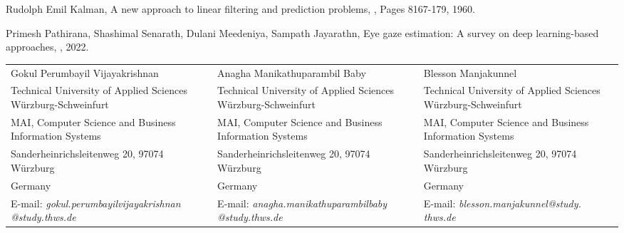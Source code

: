 \documentclass[10pt,a4paper,twoside]{article}
\begin{document}
\begin{thebibliography}{*}
Rudolph Emil Kalman,
\newblock A new approach to linear filtering and prediction problems,
, Pages 8167-179, 1960.
\vspace{-7pt}

Primesh Pathirana, Shashimal Senarath, Dulani Meedeniya, Sampath Jayarathn,
\newblock Eye gaze estimation: A survey on deep learning-based approaches,
, 2022.
\vspace{-7pt}

\end{thebibliography}

\vspace*{1cm} {\footnotesize
\begin{tabular*}{16cm}{p{4.2cm}p{4.2cm}p{4.2cm}}
Gokul Perumbayil Vijayakrishnan & Anagha Manikathuparambil Baby & Blesson Manjakunnel\\
Technical University of Applied Sciences Würzburg-Schweinfurt & Technical University of Applied Sciences Würzburg-Schweinfurt & Technical University of Applied Sciences Würzburg-Schweinfurt \\
MAI, Computer Science and Business Information Systems & MAI, Computer Science and Business Information Systems & MAI, Computer Science and Business Information Systems \\
Sanderheinrichsleitenweg 20, 97074 Würzburg & Sanderheinrichsleitenweg 20, 97074 Würzburg & Sanderheinrichsleitenweg 20, 97074 Würzburg \\
Germany & Germany & Germany\\
E-mail: \makecell {\it gokul.perumbayilvijayakrishnan\\@study.thws.de} &
E-mail: \makecell {\it anagha.manikathuparambilbaby\\@study.thws.de} &
E-mail: \makecell {\it blesson.manjakunnel@study.\\thws.de}
\end{tabular*}}
\end{document}
